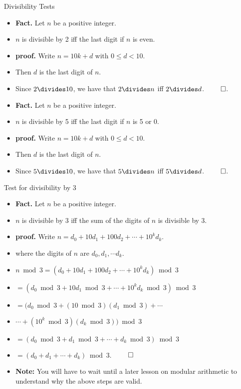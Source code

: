 \documentclass[handout]{beamer}
\begin{document}
\begin{frame}{Divisibility Tests}
\begin{itemize}
  \item \textbf{Fact.} Let $n$ be a positive integer.
  \item $n$ is divisible by 2 iff the last digit if $n$ is even.
  \item \textbf{proof.} Write $n=10k + d$ with $0\leq d < 10$.
  \item Then $d$ is the last digit of $n$.
  \item Since $2\divides 10$, we have that $2\divides n$ iff $2\divides d$. $\qed$.
  \item \textbf{Fact.}  Let $n$ be a positive integer.
  \item $n$ is divisible by 5 iff the last digit if $n$ is 5 or 0.
  \item \textbf{proof.} Write $n=10k + d$ with $0\leq d < 10$.
  \item Then $d$ is the last digit of $n$.
  \item Since $5\divides 10$, we have that $5\divides n$ iff $5\divides d$. $\qed$.
\end{itemize}

\end{frame}

\begin{frame}{Test for divisibility by 3}
\begin{itemize}
  \item \textbf{Fact.} Let $n$ be a positive integer.
  \item $n$ is divisible by 3 iff the sum of the digits of $n$ is divisible by 3.
  \item \textbf{proof.} Write $n=d_0 + 10d_1 + 100 d_2 + \cdots + 10^k d_k$.
  \item where the digits of $n$ are $d_0,d_1,\cdots d_k$.
  \item $n\bmod 3 = (d_0 + 10d_1 + 100 d_2 + \cdots + 10^k d_k)\bmod 3$
  \item  $=\left(d_0\bmod 3 + 10d_1\bmod 3 + \cdots + 10^k d_k \bmod 3 \right) \bmod 3$
  \item  $=\big(d_0\bmod 3 + (10\bmod 3)(d_1\bmod 3) + \cdots $
  \item  $  \cdots + (10^k\bmod 3) (d_k \bmod 3) \big) \bmod 3$
  \item  $=\left(d_0\bmod 3 + d_1\bmod 3 + \cdots + d_k \bmod 3 \right) \bmod 3$
  \item  $=\left(d_0 + d_1 + \cdots + d_k  \right) \bmod 3$. $\qed$
  \item \textbf{Note:} You will have to wait until a later lesson on modular arithmetic
  to understand why the above steps are valid.
\end{itemize}
\end{frame}
\end{document}
